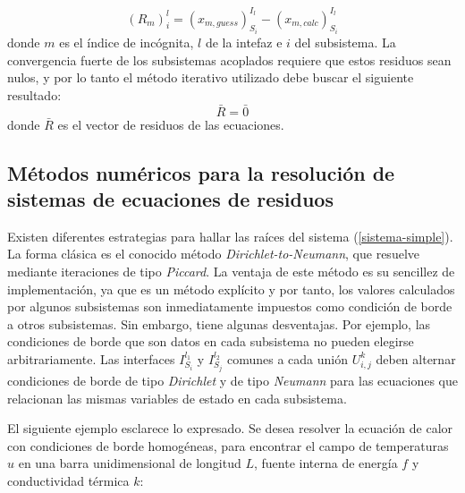 \begin{equation}
(R_m)_{i}^{l} = (x_{m,guess})_{S_i}^{I_l} - (x_{m,calc})_{S_i}^{I_l}
\label{ecuaciones-residuos}
\end{equation}
donde $m$ es el índice de incógnita, $l$ de la intefaz e $i$ del subsistema.
La convergencia fuerte de los subsistemas acoplados requiere que estos residuos sean nulos, y por lo tanto el método iterativo utilizado debe buscar el siguiente resultado:
\begin{equation}
\bar{R}=\bar{0}
\label{sistema-simple}
\end{equation}
donde $\bar{R}$ es el vector de residuos de las ecuaciones.

\subsection*{Métodos numéricos para la resolución de sistemas de ecuaciones de residuos}
\label{1:metodos}
Existen diferentes estrategias para hallar las raíces del sistema (\ref{sistema-simple}). 
La forma clásica es el conocido método \textit{Dirichlet-to-Neumann}, que resuelve mediante iteraciones de tipo \textit{Piccard}. 
La ventaja de este método es su sencillez de implementación, ya que es un método explícito y por tanto, los valores calculados por algunos subsistemas son inmediatamente impuestos como condición de borde a otros subsistemas.
Sin embargo, tiene algunas desventajas.
Por ejemplo, las condiciones de borde que son datos en cada subsistema no pueden elegirse arbitrariamente. 
Las interfaces $I_{S_i}^{l_1}$ y $I_{S_j}^{l_2}$ comunes a cada unión $U_{i,j}^k$ 
deben alternar condiciones de borde de tipo \textit{Dirichlet} y de tipo \textit{Neumann} para las ecuaciones que relacionan las mismas variables de estado en cada subsistema.

El siguiente ejemplo esclarece lo expresado. Se desea resolver la ecuación de calor con condiciones de borde homogéneas, para encontrar el campo de temperaturas $u$ en una barra unidimensional de longitud $L$, fuente interna de energía $f$ y conductividad térmica $k$:

